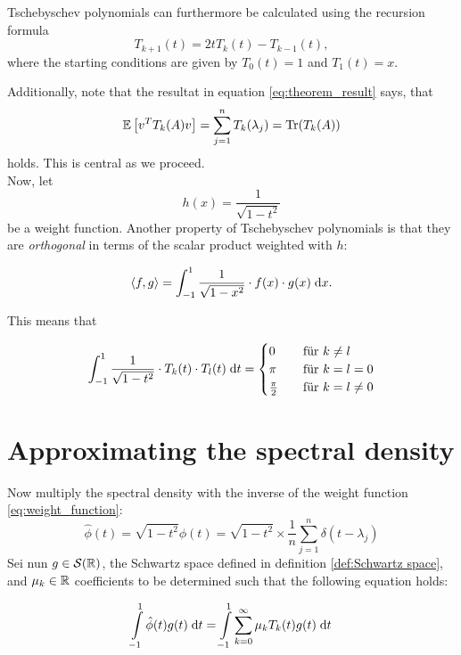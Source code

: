 Tschebyschev polynomials can furthermore be calculated using the recursion formula
\[
T_{k + 1}(t) = 2tT_k(t) - T_{k - 1}(t),
\]
where the starting conditions are given by $T_0(t) = 1$ and $T_1(t) = x$.

Additionally, note that the resultat in equation \ref{eq:theorem_result} says, that
\begin{equation} \label{eq:Tschebyschev_trace}
    \mathbb{E}\left[v^TT_k(A)v\right] = \sum_{j = 1}^n T_k(\lambda_j) = \operatorname{Tr}(T_k(A))
\end{equation}
holds. This is central as we proceed.\\

Now, let
\begin{equation} \label{eq:weight_function}
    h(x) = \frac{1}{\sqrt{1 - t^2}}
\end{equation}
be a weight function.
Another property of Tschebyschev polynomials is
that they are \emph{orthogonal} in terms of the scalar product weighted with $h$:

\[
\left \langle f, g \right \rangle = \int_{-1}^1 \frac{1}{\sqrt{1 - x^2}} \cdot f(x) \cdot g(x) \;\mathrm{d}x.
\]

This means that

\[
\int_{-1}^1 \frac{1}{\sqrt{1 - t^2}} \cdot T_k(t) \cdot T_l(t) \;\mathrm{d}t =
\begin{cases}
    0               & \quad \text{für } k \neq l\\
    \pi             & \quad \text{für } k = l = 0\\
    \frac{\pi}{2}   & \quad \text{für } k = l \neq 0
\end{cases}
\]

\section{Approximating the spectral density}
Now multiply the spectral density with the inverse of the weight function \ref{eq:weight_function}:
\[
\hat{\phi}(t) = \sqrt{1 - t^2} \phi(t) = \sqrt{1 - t^2} \times \frac{1}{n} \sum_{j = 1}^n \delta(t - \lambda_j)
\]
Sei nun $g \in \mathcal{S}(\mathbb{R})$, the Schwartz space defined in definition \ref{def:Schwartz space},
and $\mu_k \in \mathbb{R}$ coefficients to be determined such that the following equation holds:

\begin{equation} \label{eq:distribution_equality}
    \int \limits_{-1}^1 \hat{\phi}(t) g(t) \;\mathrm{d}t = \int \limits_{-1}^1 \sum_{k = 0}^{\infty} \mu_k T_k(t) g(t) \;\mathrm{d}t
\end{equation}

